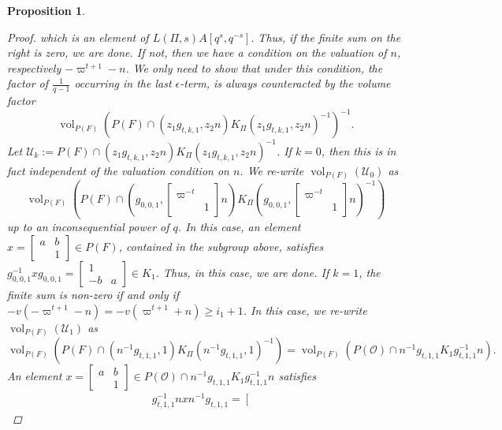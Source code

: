 \documentclass{amsart}
\theoremstyle{plain}
\newtheorem{prop}[thm]{Proposition}
\theoremstyle{plain}
\theoremstyle{remark}
\DeclareMathOperator{\vol}{vol}
\begin{document}
\begin{prop}
\begin{proof}
        which is an element of $L(\Pi,s)A[q^s,q^{-s}].$
        Thus, if the finite sum on the right is zero, we are done. If not, then we have a condition on the valuation of $n$, respectively $-\varpi^{t+1}-n$. We only need to show that under this condition, the factor of $\frac{1}{q-1}$ occurring in the last $\epsilon$-term, is always counteracted by the volume factor
        $$\vol_{P(F)}\left(P(F)\cap (z_1g_{t,k,1}, z_2n) K_\Pi (z_1g_{t,k,1}, z_2n)^{-1}\right)^{-1}.$$
        Let $\mathcal{U}_k:=P(F)\cap (z_1g_{t,k,1}, z_2n) K_\Pi (z_1g_{t,k,1}, z_2n)^{-1}$.
        If $k=0$, then this is in fact independent of the valuation condition on $n$. We re-write $\vol_{P(F)}(\mathcal{U}_0)$ as $$\vol_{P(F)}\left(P(F)\cap (g_{0,0,1}, \left[\begin{smallmatrix}
            \varpi^{-t} & \\
            & 1
        \end{smallmatrix}\right]n)K_\Pi (g_{0,0,1}, \left[\begin{smallmatrix}
            \varpi^{-t} & \\
            & 1
        \end{smallmatrix}\right]n)^{-1}\right)$$ 
        up to an inconsequential power of $q$. In this case, an element $x=\left[\begin{smallmatrix}
            a & b\\
            & 1
        \end{smallmatrix}\right]\in P(F)$, contained in the subgroup above, satisfies $g_{0,0,1}^{-1}xg_{0,0,1}=\left[\begin{smallmatrix}
            1 & \\
            -b & a
        \end{smallmatrix}\right]\in K_1$. Thus, in this case, we are done. If $k=1$, the finite sum is non-zero if and only if $-v(-\varpi^{t+1}-n)=-v(\varpi^{t+1}+n)\geq i_1 +1$. In this case, we re-write $\vol_{P(F)}(\mathcal{U}_1)$ as 
        $$\vol_{P(F)}\left( P(F)\cap (n^{-1}g_{t,1,1},1)K_\Pi (n^{-1}g_{t,1,1},1)^{-1}\right)=\vol_{P(F)}\left( P(\mathcal{O})\cap n^{-1}g_{t,1,1}K_1 g_{t,1,1}^{-1}n\right).$$
        An element $x=\left[\begin{smallmatrix}
            a & b \\
            & 1
        \end{smallmatrix}\right]\in P(\mathcal{O})\cap n^{-1}g_{t,1,1}K_1 g_{t,1,1}^{-1}n$ satisfies 
        \begin{align}\label{eq: A}g_{t,1,1}^{-1}nxn^{-1} g_{t,1,1}=\left[\begin{smallmatrix}

\end{smallmatrix}
\end{align}
\end{proof}
\end{prop}
\end{document}
